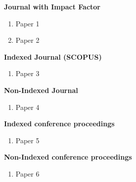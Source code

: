 \documentclass[oneside]{utmthesis}
\begin{document}

\listofpublications

\noindent \textbf{Journal with Impact Factor}
\begin{enumerate}
\item Paper 1
\item Paper 2
\end{enumerate}
\textbf{Indexed Journal (SCOPUS)}
\begin{enumerate}
\item Paper 3
\end{enumerate}
\noindent \textbf{Non-Indexed Journal}
\begin{enumerate}
\item Paper 4
\end{enumerate}
\noindent \textbf{Indexed conference proceedings}
\begin{enumerate}
\item Paper 5
\end{enumerate}
\noindent \textbf{Non-Indexed conference proceedings}
\begin{enumerate}
\item Paper 6
\end{enumerate}

\end{document}
